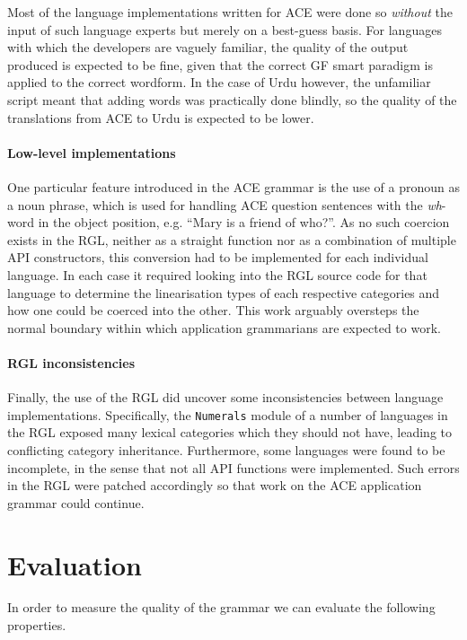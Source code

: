 \documentclass[a4paper]{article}
\begin{document}
Most of the language implementations written for ACE were done so
\emph{without} the input of such language experts but merely on a
best-guess basis. For languages with which the developers are vaguely
familiar, the quality of the output produced is expected to be
fine, given that the correct GF smart paradigm is applied to the
correct wordform.
In the case of Urdu however, the unfamiliar script meant that adding words was
practically done blindly, so the quality of the translations from ACE to Urdu
is expected to be lower.

\paragraph{Low-level implementations}
One particular feature introduced in the ACE grammar is the use of a
pronoun as a noun phrase, which is used for handling ACE question sentences with
the \emph{wh}-word in the object position, e.g. ``Mary is a friend of who?''.
As no such coercion exists in the RGL, neither as
a straight function nor as a combination of multiple API constructors,
this conversion had to be implemented for each individual language.
In each case it required looking into the RGL source code for that language
to determine the linearisation types of each respective categories
and how one could be coerced into the other.
This work arguably oversteps the normal boundary within which application
grammarians are expected to work.

\paragraph{RGL inconsistencies}
Finally, the use of the RGL did uncover some inconsistencies between
language implementations. Specifically, the \verb|Numerals| module of
a number of languages in the RGL exposed many lexical categories which
they should not have, leading to conflicting category
inheritance. Furthermore, some languages were found to be incomplete,
in the sense that not all API functions were implemented. Such errors
in the RGL were patched accordingly so that work on the ACE
application grammar could continue.


\section{Evaluation}
\label{section:Evaluation}

In order to measure the quality of the grammar we can evaluate the following
properties.
\end{document}
